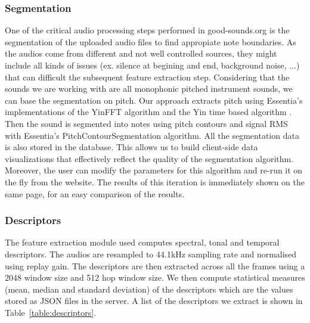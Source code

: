\documentclass{article}
\begin{document}
\subsubsection{Segmentation}
One of the critical audio processing steps  performed in good-sounds.org is the segmentation of the uploaded audio files to find appropiate note boundaries. As the audios come from different and not well controlled sources, they might include all kinds of issues (ex. silence at begining and end, background noise, ...) that can difficult the subsequent feature extraction step. Considering that the sounds we are working with are all monophonic pitched instrument sounds, we can base the segmentation on pitch. Our approach extracts pitch using Essentia’s \cite{03} implementations of the YinFFT algorithm \cite{04} and the Yin time based algorithm \cite{05}. Then the sound is segmented into notes using pitch contours \cite{06} and signal RMS with Essentia’s PitchContourSegmentation algorithm.  
All the segmentation data is also stored in the database. This allows us to build client-side data visualizations that effectively reflect the quality of the segmentation algorithm. Moreover, the user can modify the parameters for this algorithm and re-run it on the fly from the website. The results of this iteration is immediately shown on the same page, for an easy comparison of the results.

\subsubsection{Descriptors}
The feature extraction module used \cite{02} computes spectral, tonal and temporal descriptors. The audios are resampled to 44.1kHz sampling rate and normalised using replay gain. The descriptors are then extracted across all the frames using a 2048 window size and 512 hop window size. We then compute statistical measures (mean, median and standard deviation) of the descriptors which are the values stored as JSON files in the server. A list of the descriptors we extract is shown in Table~\ref{table:descriptors}. 
\end{document}
